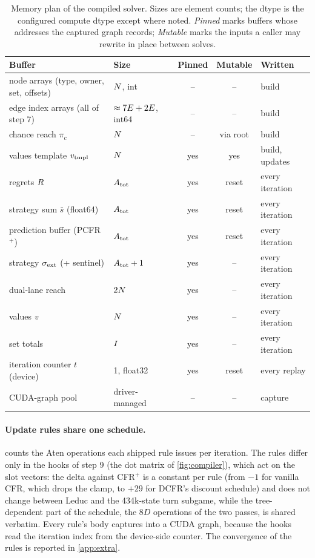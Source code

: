 \begin{table}[!htb]
\centering
\caption{Memory plan of the compiled solver. Sizes are element counts; the
dtype is the configured compute dtype except where noted. \emph{Pinned} marks
buffers whose addresses the captured graph records; \emph{Mutable} marks the
inputs a caller may rewrite in place between solves.}
\label{tab:memplan}
{
\setlength{\tabcolsep}{4pt}
\begin{tabular}{llccl}
\toprule
Buffer & Size & Pinned & Mutable & Written \\
\midrule
node arrays (type, owner, set, offsets) & $N$, int & -- & -- & build \\
edge index arrays (all of step 7) & $\approx 7E + 2E$, int64 & -- & -- & build \\
chance reach $\pi_c$ & $N$ & -- & via root & build \\
values template $v_{\mathrm{tmpl}}$ & $N$ & yes & yes & build, updates \\
regrets $R$ & $A_{\mathrm{tot}}$ & yes & reset & every iteration \\
strategy sum $\bar{s}$ (float64) & $A_{\mathrm{tot}}$ & yes & reset & every iteration \\
prediction buffer (PCFR$^{+}$) & $A_{\mathrm{tot}}$ & yes & reset & every iteration \\
strategy $\sigma_{\mathrm{ext}}$ (+ sentinel) & $A_{\mathrm{tot}} + 1$ & yes & -- & every iteration \\
dual-lane reach & $2N$ & yes & -- & every iteration \\
values $v$ & $N$ & yes & -- & every iteration \\
set totals & $I$ & yes & -- & every iteration \\
iteration counter $t$ (device) & 1, float32 & yes & reset & every replay \\
CUDA-graph pool & driver-managed & -- & -- & capture \\
\bottomrule
\end{tabular}}
\end{table}

\paragraph{Update rules share one schedule.}
 counts the Aten operations each shipped rule issues per
iteration. The rules differ only in the hooks of step 9 (the dot matrix of
\cref{fig:compiler}), which act on the slot vectors: the delta against CFR$^{+}$ is a constant per rule (from $-1$ for vanilla
CFR, which drops the clamp, to $+29$ for DCFR's discount schedule) and
does not change between Leduc and the 434k-state turn subgame, while the
tree-dependent part of the schedule, the $8D$ operations of the two passes, is
shared verbatim. Every rule's body captures into a CUDA graph, because the hooks
read the iteration index from the device-side counter. The convergence of the rules is reported in \cref{app:extra}.


